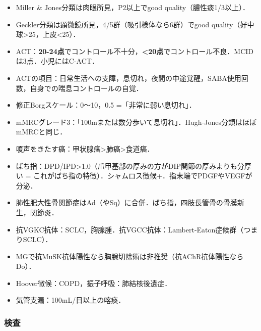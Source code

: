\begin{itemize}
\item Miller \& Jones分類は肉眼所見，P2以上でgood quality（膿性痰1/3以上）．
\item Geckler分類は顕微鏡所見，4/5群（吸引検体なら6群）でgood quality（好中球>25，上皮<25）．

\item ACT：\textbf{20-24点}でコントロール不十分，\textbf{<20点}でコントロール不良．MCIDは3点．小児にはC-ACT．
\item ACTの項目：日常生活への支障，息切れ，夜間の中途覚醒，SABA使用回数，自身での喘息コントロールの自覚．
\item 修正Borgスケール：0〜10，0.5 =「非常に弱い息切れ」．
\item mMRCグレード3：「100mまたは数分歩いて息切れ」．Hugh-Jones分類はほぼmMRCと同じ．


\item 嗄声をきたす癌：甲状腺癌>肺癌>食道癌．
\item ばち指：DPD/IPD>1.0（爪甲基部の厚みの方がDIP関節の厚みよりも分厚い = これがばち指の特徴）．シャムロス徴候+．指末端でPDGFやVEGFが分泌．
\item 肺性肥大性骨関節症はAd（やSq）に合併．ばち指，四肢長管骨の骨膜新生，関節炎．
\item 抗VGKC抗体：SCLC，胸腺腫．抗VGCC抗体：Lambert-Eaton症候群（つまりSCLC）．
\item MGで抗MuSK抗体陽性なら胸腺切除術は非推奨（抗AChR抗体陽性ならDo）．
\item Hoover徴候：COPD，振子呼吸：肺結核後遺症．
\item 気管支漏：100mL/日以上の喀痰．
\end{itemize}


\subsubsection{検査}

